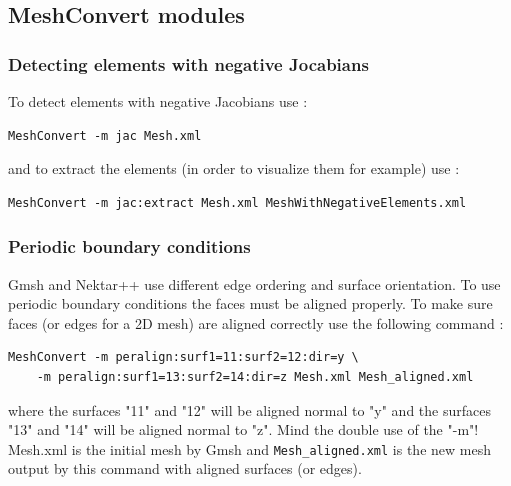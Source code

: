 \subsection{MeshConvert modules}
\subsubsection{Detecting elements with negative Jocabians}
To detect elements with negative Jacobians use :
\begin{lstlisting}[style=BashInputStyle]
MeshConvert -m jac Mesh.xml
\end{lstlisting}
and to extract the elements (in order to visualize them for example) use :
\begin{lstlisting}[style=BashInputStyle]
MeshConvert -m jac:extract Mesh.xml MeshWithNegativeElements.xml
\end{lstlisting}
\subsubsection{Periodic boundary conditions}
Gmsh and Nektar++ use different edge ordering and surface orientation. To use periodic boundary conditions the faces must be aligned properly. To make sure faces (or edges for a 2D mesh) are aligned correctly use the following command :
\begin{lstlisting}[style=BashInputStyle]
MeshConvert -m peralign:surf1=11:surf2=12:dir=y \
    -m peralign:surf1=13:surf2=14:dir=z Mesh.xml Mesh_aligned.xml
\end{lstlisting}
where the surfaces "11" and "12" will be aligned normal to "y" and the surfaces "13" and "14" will be aligned normal to "z". Mind the double use of the "-m"! Mesh.xml is the initial mesh by Gmsh and \verb+Mesh_aligned.xml+ is the new mesh output by this command with aligned surfaces (or edges).
